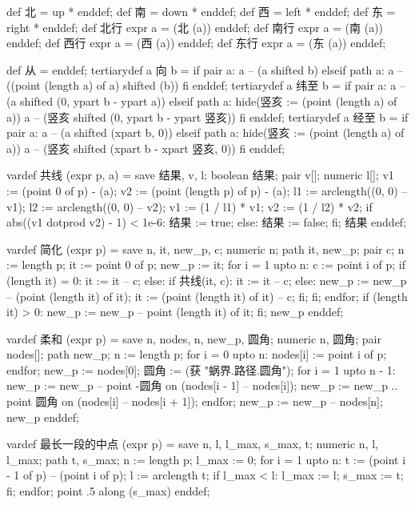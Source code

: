 \startMPinclusions[+]
def 北 = up * enddef; def 南 = down * enddef;
def 西 = left * enddef; def 东 = right * enddef;
def 北行 expr a = (北 (a)) enddef;
def 南行 expr a = (南 (a)) enddef;
def 西行 expr a = (西 (a)) enddef;
def 东行 expr a = (东 (a)) enddef;

def 从 = enddef;
tertiarydef a 向 b =
  if pair a:
    a -- (a shifted b)
  elseif path a:
    a -- ((point (length a) of a) shifted (b))
  fi
enddef;
tertiarydef a 纬至 b = 
  if pair a:
    a -- (a shifted (0, ypart b - ypart a))
  elseif path a:
    hide(竖亥 := (point (length a) of a))
    a -- (竖亥 shifted (0, ypart b - ypart 竖亥))
  fi
enddef;
tertiarydef a 经至 b = 
  if pair a:
    a -- (a shifted (xpart b, 0))
  elseif path a:
    hide(竖亥 := (point (length a) of a))
    a -- (竖亥 shifted (xpart b - xpart 竖亥, 0))
  fi
enddef;
\stopMPinclusions

\startMPinclusions[+]
vardef 共线 (expr p, a) =
  save 结果, v, l; boolean 结果; pair v[]; numeric l[];
  v1 := (point 0 of p) - (a);
  v2 := (point (length p) of p) - (a);
  l1 := arclength((0, 0) -- v1); %
  l2 := arclength((0, 0) -- v2); %
  v1 := (1 / l1) * v1; v2 := (1 / l2) * v2;
  if abs((v1 dotprod v2) - 1) < 1e-6:
     结果 := true;
  else:
    结果 := false;
  fi;
  结果
enddef;

vardef 简化 (expr p) =
  save n, it, new_p, c;
  numeric n; path it, new_p; pair c;
  n := length p;
  it := point 0 of p;
  new_p := it;
  for i = 1 upto n:
    c := point i of p;
    if (length it) = 0: 
      it := it -- c;
    else:
      if 共线(it, c):
        it := it -- c;
      else:
        new_p := new_p -- (point (length it) of it);
        it := (point (length it) of it) -- c;
      fi;
    fi;
  endfor;
  if (length it) > 0:
    new_p := new_p -- point (length it) of it;
  fi;
  new_p
enddef;

vardef 柔和 (expr p) =
  save n, nodes, n, new_p, 圆角; 
  numeric n, 圆角; pair nodes[]; path new_p;
  n := length p;
  for i = 0 upto n:
    nodes[i] := point i of p;
  endfor;
  new_p := nodes[0];
  圆角 := (获 "蜗界.路径.圆角");
  for i = 1 upto n - 1:
    new_p := new_p -- point -圆角 on (nodes[i - 1] -- nodes[i]);
    new_p := new_p .. point 圆角 on (nodes[i] -- nodes[i + 1]);
  endfor;
  new_p := new_p -- nodes[n];
  new_p
enddef;
\stopMPinclusions

\startMPinclusions[+]
vardef 最长一段的中点 (expr p) =
  save n, l, l_max, s_max, t;
  numeric n, l, l_max; path t, s_max;
  n := length p;
  l_max := 0;
  for i = 1 upto n:
    t := (point i - 1 of p) -- (point i of p);
    l := arclength t;
    if l_max < l:
      l_max := l; s_max := t;
    fi;
  endfor;
  point .5 along (s_max)
enddef;

